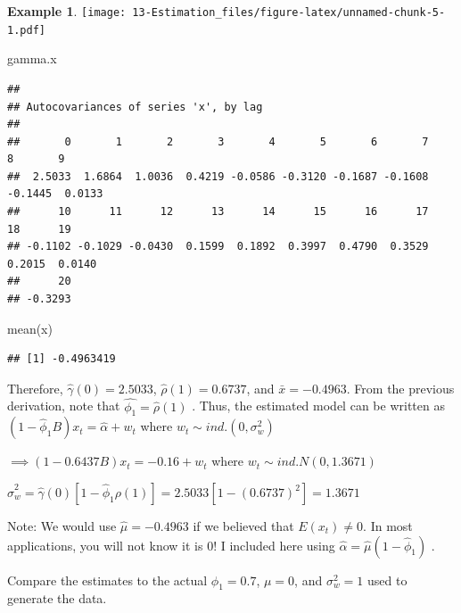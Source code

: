 \documentclass[
]{book}
\newenvironment{Shaded}{\begin{snugshade}}{\end{snugshade}}
\newcommand{\FunctionTok}[1]{\textcolor[rgb]{0.00,0.00,0.00}{#1}}
\newcommand{\NormalTok}[1]{#1}
\theoremstyle{definition}
\theoremstyle{definition}
\newtheorem{example}{Example}[chapter]
\theoremstyle{definition}
\theoremstyle{definition}
\theoremstyle{remark}
\begin{document}
\begin{example}
\texttt{[image: 13-Estimation\_files/figure-latex/unnamed-chunk-5-1.pdf]}

\begin{Shaded}
\begin{Highlighting}[]
\NormalTok{gamma.x}
\end{Highlighting}
\end{Shaded}

\begin{verbatim}
## 
## Autocovariances of series 'x', by lag
## 
##       0       1       2       3       4       5       6       7       8       9 
##  2.5033  1.6864  1.0036  0.4219 -0.0586 -0.3120 -0.1687 -0.1608 -0.1445  0.0133 
##      10      11      12      13      14      15      16      17      18      19 
## -0.1102 -0.1029 -0.0430  0.1599  0.1892  0.3997  0.4790  0.3529  0.2015  0.0140 
##      20 
## -0.3293
\end{verbatim}

\begin{Shaded}
\begin{Highlighting}[]
\FunctionTok{mean}\NormalTok{(x)}
\end{Highlighting}
\end{Shaded}

\begin{verbatim}
## [1] -0.4963419
\end{verbatim}

Therefore, \(\hat{\gamma}(0)= 2.5033\), \(\hat{\rho}(1)= 0.6737\), and \(\bar{x}= -0.4963\). From the previous derivation, note that \(\hat{\phi_1}=\hat{\rho}(1)\) . Thus, the estimated model can be written as \((1 -\hat{\phi}_1B)x_t = \hat{\alpha}+ w_t\) where \(w_t \sim ind.(0,\sigma_w^2)\)

\(\implies (1-0.6437B)x_t=-0.16+w_t\) where \(w_t \sim ind.N(0,1.3671)\)

\(\hat{\sigma}_w^2=\hat{\gamma}(0)[1-\hat\phi_1\rho(1)]=2.5033[1-(0.6737)^2]=1.3671\)

Note: We would use \(\hat\mu=-0.4963\) if we believed that \(E(x_t) \ne 0\). In most applications, you will not know it is 0! I included here using \(\hat\alpha=\hat\mu(1-\hat\phi_1)\) .

Compare the estimates to the actual \(\phi_1 = 0.7\), \(\mu = 0\), and \(\sigma_w^2= 1\) used to generate the data.
\end{example}
\end{document}

